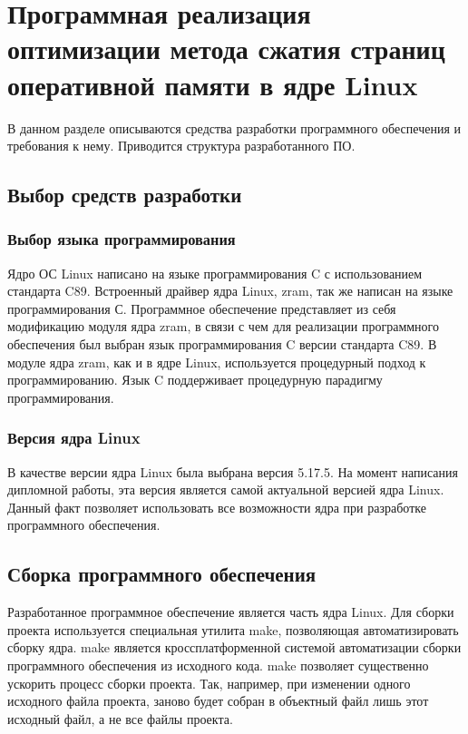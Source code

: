 \section{Программная реализация оптимизации метода сжатия страниц оперативной памяти в ядре Linux}

В данном разделе описываются средства разработки программного обеспечения и требования к нему. Приводится структура разрабо­танного ПО.

\subsection{Выбор средств разработки}

\subsubsection{Выбор языка программирования}

Ядро ОС Linux написано на языке программирования C с использованием стандарта C89. Встроенный драйвер ядра Linux, zram, так же написан на языке программирования С. Программное обеспечение представляет из себя модификацию модуля ядра zram, в связи с чем для реализации программного обеспечения был выбран язык программирования C версии стандарта C89. В модуле ядра zram, как и в ядре Linux, используется процедурный подход к программированию. Язык C поддерживает процедурную парадигму программирования.

\subsubsection{Версия ядра Linux}

В качестве версии ядра Linux была выбрана версия 5.17.5. На момент написания дипломной работы, эта версия является самой актуальной версией ядра Linux. Данный факт позволяет использовать все возможности ядра при разработке программного обеспечения. 

\subsection{Сборка программного обеспечения}

Разработанное программное обеспечение является часть ядра Linux. Для сборки проекта используется специальная утилита make, позволяющая автоматизировать сборку ядра. make является кроссплатформенной системой автоматизации сборки программного обеспечения из исходного кода. make позволяет существенно ускорить процесс сборки проекта. Так, например, при изменении одного исходного файла проекта, заново будет собран в объектный файл лишь этот исходный файл, а не все файлы проекта.

